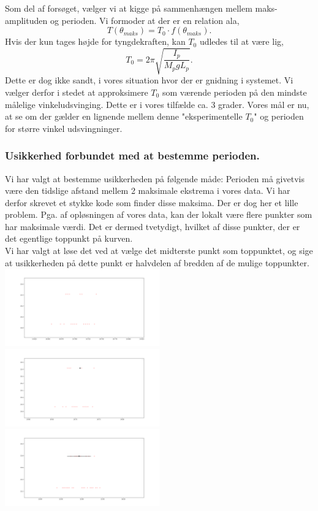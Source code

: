 \begin{solution}
Som del af forsøget, vælger vi at kigge på sammenhængen mellem maks-amplituden og perioden. Vi formoder at der er en relation ala,
\[
	T(\theta_{maks}) = T_0 \cdot f(\theta_{maks})
.\]
Hvis der kun tages højde for tyngdekraften, kan $T_0$ udledes til at være lig,
\[
T_0 = 2\pi \sqrt{\frac{I_p}{M_pgL_p}} 
.\]
Dette er dog ikke sandt, i vores situation hvor der er gnidning i systemet. Vi vælger derfor i stedet at approksimere $T_0$ som værende perioden på den mindste målelige vinkeludsvinging. Dette er i vores tilfælde ca. 3 grader. Vores mål er nu, at se om der gælder en lignende mellem denne "eksperimentelle $T_0$" og perioden for større vinkel udsvingninger.
\subsubsection*{Usikkerhed forbundet med at bestemme perioden.}
Vi har valgt at bestemme usikkerheden på følgende måde: Perioden må givetvis være den tidslige afstand mellem 2 maksimale ekstrema i vores data. Vi har derfor skrevet et stykke kode som finder disse maksima. Der er dog her et lille problem. Pga. af opløsningen af vores data, kan der lokalt være flere punkter som har maksimale værdi. Det er dermed tvetydigt, hvilket af disse punkter, der er det egentlige toppunkt på kurven.\\
Vi har valgt at løse det ved at vælge det midterste punkt som toppunktet, og sige at usikkerheden på dette punkt er halvdelen af bredden af de mulige toppunkter.
\columnbreak
\includegraphics[width=0.5\textwidth]{../toppunkt1}
\includegraphics[width=0.5\textwidth]{../toppunkt2}
\includegraphics[width=0.5\textwidth]{../toppunkt3}

\end{solution}
